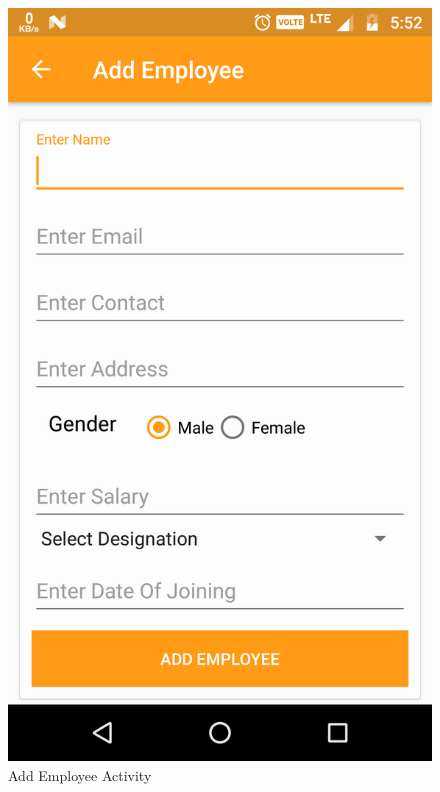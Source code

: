 \\
\begin{figure}[h]
	\centering
	\includegraphics[width=0.7\linewidth]{AddEmployeeActivity}
	\caption{Add Employee Activity}
\end{figure}
\pagebreak


